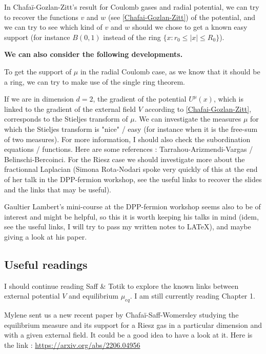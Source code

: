\documentclass[a4paper,12pt]{report}
\begin{document}
In Chafaï-Gozlan-Zitt's result for Coulomb gases and radial potential, we can try to recover the functions $v$ and $w$ (see \ref{Chafai-Gozlan-Zitt}) of the potential, and we can try to see which kind of $v$ and $w$ should we chose to get a known easy support (for instance $B(0, 1)$ instead of the ring $\{x : r_0 \leq |x| \leq R_0\}$).
\vspace{0.5cm}

\textbf{We can also consider the following developments.}
\vspace{0.5cm}

To get the support of $\mu$ in the radial Coulomb case, as we know that it should be a ring, we can try to make use of the single ring theorem.
\vspace{0.5cm}

If we are in dimension $d = 2$, the gradient of the potential $U^{\mu}(x)$, which is linked to the gradient of the external field $V$ according to \ref{Chafai-Gozlan-Zitt},  corresponds to the Stieljes transform of $\mu$. We can investigate the measures $\mu$ for which the Stieljes transform is "nice" / easy (for instance when it is the free-sum of two measures). For more information, I should also check the subordination equations / functions. Here are some references : Tarrahou-Arizmendi-Vargas / Belinschi-Bercoinci. For the Riesz case we should investigate more about the fractionnal Laplacian (Simona Rota-Nodari spoke very quickly of this at the end of her talk in the DPP-fermion workshop, see the useful links to recover the slides and the links that may be useful).
\vspace{0.5cm}

Gaultier Lambert's mini-course at the DPP-fermion workshop seems also to be of interest and might be helpful, so this it is worth keeping his talks in mind (idem, see the useful links, I will try to pass my written notes to LATeX), and maybe giving a look at his paper.



\subsection*{Useful readings}

I should continue reading Saff \& Totik \cite{saff-totik} to explore the known links between external potential $V$ and equilibrium $\mu_{eq}$. I am still currently reading Chapter 1.
\vspace{0.5cm}

Mylene sent us a new recent paper by Chafaï-Saff-Womersley \cite{chafai-saff-womersley} studying the equilibrium measure and its support for a Riesz gas in a particular dimension and with a given external field. It could be a good idea to have a look at it. Here is the link : \href{https://arxiv.org/abs/2206.04956}{https://arxiv.org/abs/2206.04956}
\end{document}
